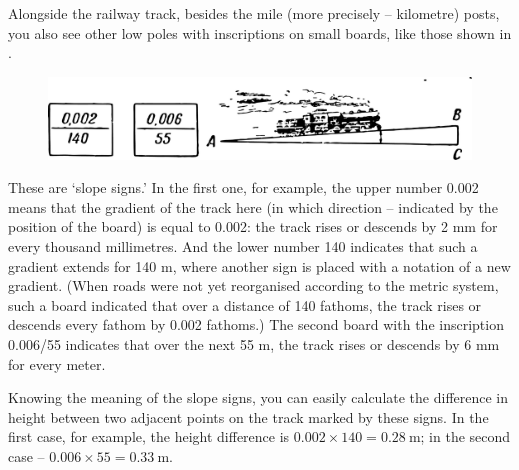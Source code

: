 Alongside the railway track, besides the mile (more precisely -- kilometre) posts, you also see other low poles with inscriptions on small boards, like those shown in .

\begin{figure}[h!]
\centering
\includegraphics[width=\textwidth]{figures/ch-04/fig-081.pdf}
\end{figure}


These are `slope signs.' In the first one, for example, the upper number 0.002 means that the gradient of the track here (in which direction -- indicated by the position of the board) is equal to 0.002: the track rises or descends by 2 mm for every thousand millimetres. And the lower number 140 indicates that such a gradient extends for 140 m, where another sign is placed with a notation of a new gradient. (When roads were not yet reorganised according to the metric system, such a board indicated that over a distance of 140 fathoms, the track rises or descends every fathom by 0.002 fathoms.) The second board with the inscription 0.006/55 indicates that over the next 55 m, the track rises or descends by 6 mm for every meter.

Knowing the meaning of the slope signs, you can easily calculate the difference in height between two adjacent points on the track marked by these signs. In the first case, for example, the height difference is $0.002 \times 140 = \SI{0.28}{\meter}$; in the second case -- $0.006 \times 55 = \SI{0.33}{\meter}$.

